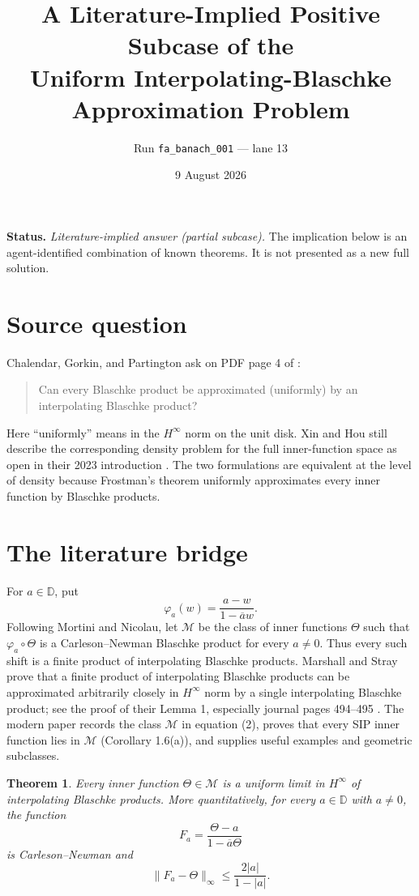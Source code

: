 \documentclass[10pt]{article}
\title{A Literature-Implied Positive Subcase of the\\
Uniform Interpolating-Blaschke Approximation Problem}
\author{Run \texttt{fa\_banach\_001} --- lane 13}
\date{9 August 2026}
\newtheorem{theorem}{Theorem}
\newcommand{\D}{\mathbb D}
\newcommand{\M}{\mathcal M}
\newcommand{\norm}[1]{\lVert #1\rVert_\infty}
\begin{document}
\maketitle

\noindent\textbf{Status.}
\emph{Literature-implied answer (partial subcase).}  The implication below is
an agent-identified combination of known theorems.  It is not presented as a
new full solution.

\section*{Source question}

Chalendar, Gorkin, and Partington ask on PDF page 4 of
\cite{CGP2015}:
\begin{quote}
Can every Blaschke product be approximated (uniformly) by an interpolating
Blaschke product?
\end{quote}
Here ``uniformly'' means in the $H^\infty$ norm on the unit disk.  Xin and Hou
still describe the corresponding density problem for the full inner-function
space as open in their 2023 introduction \cite{XinHou2023}.  The two
formulations are equivalent at the level of density because Frostman's theorem
uniformly approximates every inner function by Blaschke products.

\section*{The literature bridge}

For $a\in\D$, put
\[
 \varphi_a(w)=\frac{a-w}{1-\overline a w}.
\]
Following Mortini and Nicolau, let $\M$ be the class of inner functions
$\Theta$ such that $\varphi_a\circ\Theta$ is a Carleson--Newman Blaschke
product for every $a\ne0$.  Thus every such shift is a finite product of
interpolating Blaschke products.  Marshall and Stray prove that a finite
product of interpolating Blaschke products can be approximated arbitrarily
closely in $H^\infty$ norm by a single interpolating Blaschke product; see the
proof of their Lemma 1, especially journal pages 494--495
\cite{MarshallStray1996}.  The modern paper \cite{BNOT2025} records the class
$\M$ in equation (2), proves that every SIP inner function lies in $\M$
(Corollary 1.6(a)), and supplies useful examples and geometric subclasses.

\begin{theorem}
Every inner function $\Theta\in\M$ is a uniform limit in $H^\infty$ of
interpolating Blaschke products.  More quantitatively, for every $a\in\D$
with $a\ne0$, the function
\[
 F_a=\frac{\Theta-a}{1-\overline a\Theta}
\]
is Carleson--Newman and
\begin{equation}\label{eq:error}
 \norm{F_a-\Theta}\le \frac{2|a|}{1-|a|}.
\end{equation}
\end{theorem}
\end{document}

